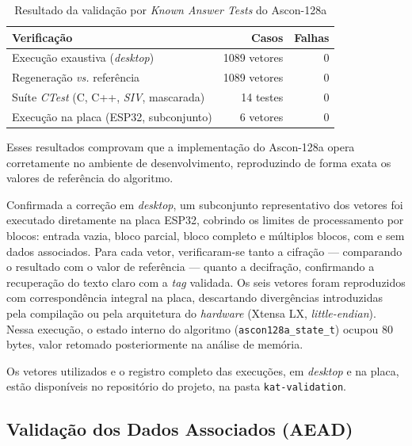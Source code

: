 \begin{table}[htb]
\centering
\caption{Resultado da validação por \textit{Known Answer Tests} do Ascon-128a}
\label{tab:kat_ascon128a}
\begin{tabular}{lrr}
\hline
\textbf{Verificação} & \textbf{Casos} & \textbf{Falhas} \\
\hline
Execução exaustiva (\textit{desktop})                  & 1089 vetores & 0 \\
Regeneração \textit{vs.} referência                    & 1089 vetores & 0 \\
Suíte \textit{CTest} (C, C++, \textit{SIV}, mascarada) & 14 testes    & 0 \\
Execução na placa (ESP32, subconjunto)                 & 6 vetores    & 0 \\
\hline
\end{tabular}
\end{table}

Esses resultados comprovam que a implementação do Ascon-128a opera corretamente no ambiente de desenvolvimento, reproduzindo de forma exata os valores de referência do algoritmo.

Confirmada a correção em \textit{desktop}, um subconjunto representativo dos vetores foi executado diretamente na placa ESP32, cobrindo os limites de processamento por blocos: entrada vazia, bloco parcial, bloco completo e múltiplos blocos, com e sem dados associados. Para cada vetor, verificaram-se tanto a cifração — comparando o resultado com o valor de referência — quanto a decifração, confirmando a recuperação do texto claro com a \textit{tag} validada. Os seis vetores foram reproduzidos com correspondência integral na placa, descartando divergências introduzidas pela compilação ou pela arquitetura do \textit{hardware} (Xtensa LX, \textit{little-endian}). Nessa execução, o estado interno do algoritmo (\texttt{ascon128a\_state\_t}) ocupou 80 bytes, valor retomado posteriormente na análise de memória.

Os vetores utilizados e o registro completo das execuções, em \textit{desktop} e na placa, estão disponíveis no repositório do projeto, na pasta \texttt{kat-validation}.


\subsection{Validação dos Dados Associados (AEAD)}

